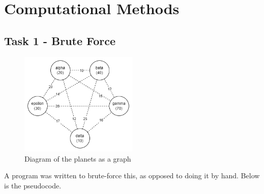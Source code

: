 \documentclass[
]{article}
\author{}
\date{}
\begin{document}
\section{Computational Methods}\label{computational-methods}

\subsection{Task 1 - Brute Force}\label{task-1---brute-force}

\begin{figure}
\centering
\includegraphics[width=0.5\textwidth,height=\textheight]{diagrams/bruteforce_diagram.png}
\caption{Diagram of the planets as a graph}
\end{figure}

A program was written to brute-force this, as opposed to doing it by
hand. Below is the pseudocode.
\end{document}
